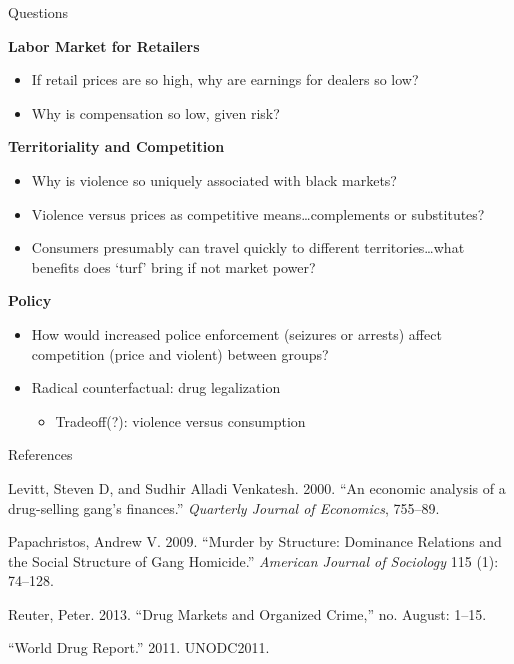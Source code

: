 \documentclass[10pt,ignorenonframetext,]{beamer}
\providecommand{\tightlist}{%
  \setlength{\itemsep}{0pt}\setlength{\parskip}{0pt}}
\begin{document}
\begin{frame}{Questions}
\protect\hypertarget{questions}{}

\textbf{Labor Market for Retailers}

\begin{itemize}
\tightlist
\item
  If retail prices are so high, why are earnings for dealers so low?
\item
  Why is compensation so low, given risk?
\end{itemize}

\textbf{Territoriality and Competition}

\begin{itemize}
\tightlist
\item
  Why is violence so uniquely associated with black markets?
\item
  Violence versus prices as competitive means\ldots complements or
  substitutes?
\item
  Consumers presumably can travel quickly to different
  territories\ldots what benefits does `turf' bring if not market power?
\end{itemize}

\textbf{Policy}

\begin{itemize}
\tightlist
\item
  How would increased police enforcement (seizures or arrests) affect
  competition (price and violent) between groups?
\item
  Radical counterfactual: drug legalization

  \begin{itemize}
  \tightlist
  \item
    Tradeoff(?): violence versus consumption
  \end{itemize}
\end{itemize}

\end{frame}

\begin{frame}{References}
\protect\hypertarget{references}{}

\hypertarget{refs}{}
\leavevmode\hypertarget{ref-Levitt2000}{}%
Levitt, Steven D, and Sudhir Alladi Venkatesh. 2000. ``An economic
analysis of a drug-selling gang's finances.'' \emph{Quarterly Journal of
Economics}, 755--89.

\leavevmode\hypertarget{ref-Papachristos2009}{}%
Papachristos, Andrew V. 2009. ``Murder by Structure: Dominance Relations
and the Social Structure of Gang Homicide.'' \emph{American Journal of
Sociology} 115 (1): 74--128.

\leavevmode\hypertarget{ref-Reuter2010}{}%
Reuter, Peter. 2013. ``Drug Markets and Organized Crime,'' no. August:
1--15.

\leavevmode\hypertarget{ref-UNODC2011}{}%
``World Drug Report.'' 2011. UNODC2011.

\end{frame}


\end{document}
